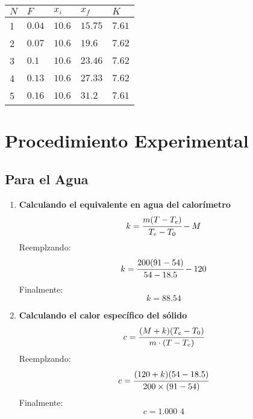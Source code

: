 \begin{center}
	\begin{tabular}{C{0.5cm}C{1cm}C{1cm}C{1cm}C{1cm}}
		$N$ & $F$    & $x_i$  & $x_f$   & $K$    \\
		   & $0.04$ & $10.6$ & $15.75$ & $7.61$ \\
		2   & $0.07$ & $10.6$ & $19.6$  & $7.62$ \\
		3   & $0.1$  & $10.6$ & $23.46$ & $7.62$ \\
		4   & $0.13$ & $10.6$ & $27.33$ & $7.62$ \\
		5   & $0.16$ & $10.6$ & $31.2$  & $7.61$
	\end{tabular}
\end{center}

\section{Procedimiento Experimental}
\subsection{Para el Agua}
\begin{enumerate}[label=\bfseries\alph*.-,itemsep=2pt, partopsep=6pt]
	\item \textbf{Calculando el equivalente en agua del calorímetro}
	      \[k=\cfrac{m(T-T_e)}{T_e-T_0}-M\]
	      Reemplzando:
	      \[k=\cfrac{200(91-54)}{54-18.5}-120\]
	      Finalmente:
	      \[k=88.54\]
	\item \textbf{Calculando el calor específico del sólido}
	      \[c=\cfrac{(M+k)(T_e-T_0)}{m\cdot(T-T_e)}\]
	      Reemplzando:
	      \[c=\cfrac{(120+k)(54-18.5)}{200\times(91-54)}\]
	      Finalmente:
	      \[c=1.000\,\,4\]
\end{enumerate}
